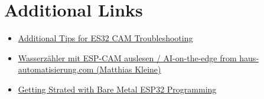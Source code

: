 \section{Additional Links}
\begin{itemize}

\item \href{https://randomnerdtutorials.com/esp32-cam-troubleshooting-guide/}{Additional Tips for ES32 CAM Troubleshooting}

\item \href{https://www.youtube.com/watch?v=mDIJEyElkAU&t=1139s}{Wasserz\"ahler mit ESP-CAM auslesen / AI-on-the-edge from haus-automatisierung.com (Matthias Kleine)}

\item \href{https://vivonomicon.com/2019/03/30/getting-started-with-bare-metal-esp32-programming/}{Getting Strated with Bare Metal ESP32 Programming}

\end{itemize}